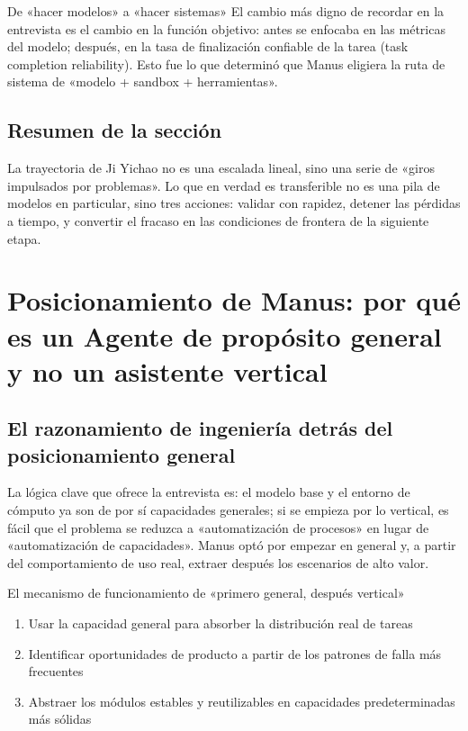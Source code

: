 \documentclass[a4paper]{article}
\begin{document}
\begin{importantbox}{De «hacer modelos» a «hacer sistemas»}
El cambio más digno de recordar en la entrevista es el cambio en la función objetivo: antes se enfocaba en las métricas del modelo; después, en la tasa de finalización confiable de la tarea (task completion reliability). Esto fue lo que determinó que Manus eligiera la ruta de sistema de «modelo + sandbox + herramientas».
\end{importantbox}

\subsection{Resumen de la sección}

La trayectoria de Ji Yichao no es una escalada lineal, sino una serie de «giros impulsados por problemas». Lo que en verdad es transferible no es una pila de modelos en particular, sino tres acciones: validar con rapidez, detener las pérdidas a tiempo, y convertir el fracaso en las condiciones de frontera de la siguiente etapa.
\section{Posicionamiento de Manus: por qué es un Agente de propósito general y no un asistente vertical}

\subsection{El razonamiento de ingeniería detrás del posicionamiento general}

La lógica clave que ofrece la entrevista es: el modelo base y el entorno de cómputo ya son de por sí capacidades generales; si se empieza por lo vertical, es fácil que el problema se reduzca a «automatización de procesos» en lugar de «automatización de capacidades». Manus optó por empezar en general y, a partir del comportamiento de uso real, extraer después los escenarios de alto valor.

\begin{knowledgebox}{El mecanismo de funcionamiento de «primero general, después vertical»}
\begin{enumerate}
    \item Usar la capacidad general para absorber la distribución real de tareas
    \item Identificar oportunidades de producto a partir de los patrones de falla más frecuentes
    \item Abstraer los módulos estables y reutilizables en capacidades predeterminadas más sólidas
\end{enumerate}
\end{knowledgebox}
\end{document}
